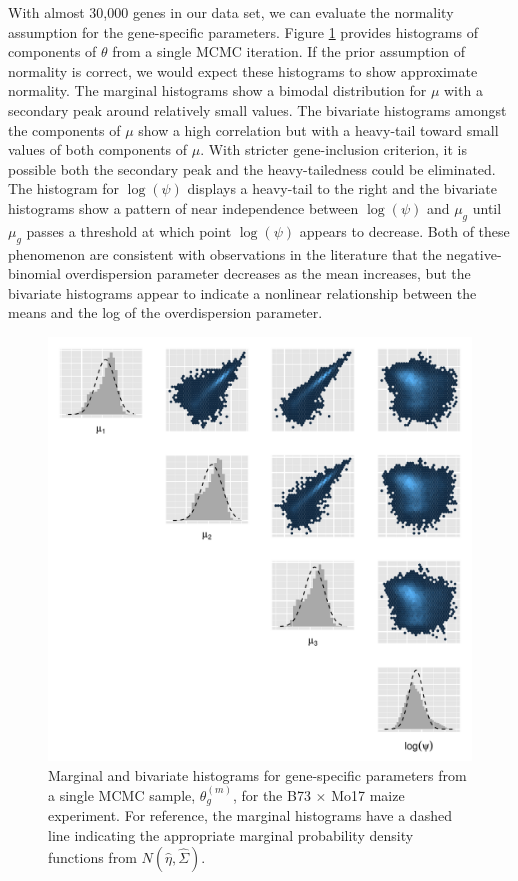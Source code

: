 \documentclass[useAMS,usenatbib,referee]{biom}
\begin{document}
With almost 30,000 genes in our data set, we can evaluate the normality assumption for the gene-specific parameters. Figure \ref{f:normality} provides histograms of components of $\theta$ from a single MCMC iteration. If the prior assumption of normality is correct, we would expect these histograms to show approximate normality. The marginal histograms show a bimodal distribution for $\mu$ with a secondary peak around relatively small values. The bivariate histograms amongst the components of $\mu$ show a high correlation but with a heavy-tail toward small values of both components of $\mu$. With stricter gene-inclusion criterion, it is possible both the secondary peak and the heavy-tailedness could be eliminated. The histogram for $\log(\psi)$ displays a heavy-tail to the right and the bivariate histograms show a pattern of near independence between $\log(\psi)$ and $\mu_g$ until $\mu_g$ passes a threshold at which point $\log(\psi)$ appears to decrease. Both of these phenomenon are consistent with observations in the literature that the negative-binomial overdispersion parameter decreases as the mean increases, but the bivariate histograms appear to indicate a nonlinear relationship between the means and the log of the overdispersion parameter.

\begin{figure}
\centerline{\includegraphics[width=\textwidth]{normality}}
\caption{Marginal and bivariate histograms for gene-specific parameters from a single MCMC sample, $\theta_g^{(m)}$,  for the B73 $\times$ Mo17 maize experiment. For reference, the marginal histograms have a dashed line indicating the appropriate marginal probability density functions from $N(\hat{\eta},\hat{\Sigma})$.}
\label{f:normality}
\end{figure}
\end{document}

